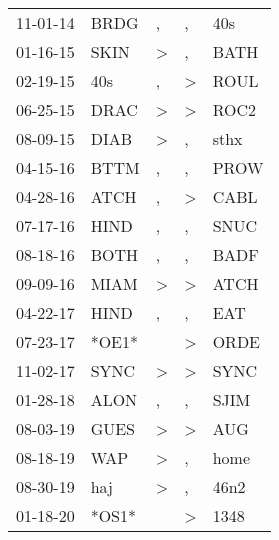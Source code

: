 \begin{supertabular}{lllll}
 11-01-14 &   BRDG &                , &                , &    40s \\
 01-16-15 &   SKIN &     \textgreater &                , &   BATH \\
 02-19-15 &    40s &                , &     \textgreater &   ROUL \\
 06-25-15 &   DRAC &     \textgreater &     \textgreater &   ROC2 \\
 08-09-15 &   DIAB &     \textgreater &                , &   sthx \\
 04-15-16 &   BTTM &                , &                , &   PROW \\
 04-28-16 &   ATCH &                , &     \textgreater &   CABL \\
 07-17-16 &   HIND &                , &                , &   SNUC \\
 08-18-16 &   BOTH &                , &                , &   BADF \\
 09-09-16 &   MIAM &     \textgreater &     \textgreater &   ATCH \\
 04-22-17 &   HIND &                , &                , &    EAT \\
 07-23-17 &  *OE1* &                  &     \textgreater &   ORDE \\
 11-02-17 &   SYNC &     \textgreater &     \textgreater &   SYNC \\
 01-28-18 &   ALON &                , &                , &   SJIM \\
 08-03-19 &   GUES &     \textgreater &     \textgreater &    AUG \\
 08-18-19 &    WAP &     \textgreater &                , &   home \\
 08-30-19 &    haj &     \textgreater &                , &   46n2 \\
 01-18-20 &  *OS1* &                  &     \textgreater &   1348 \\
\end{supertabular}

